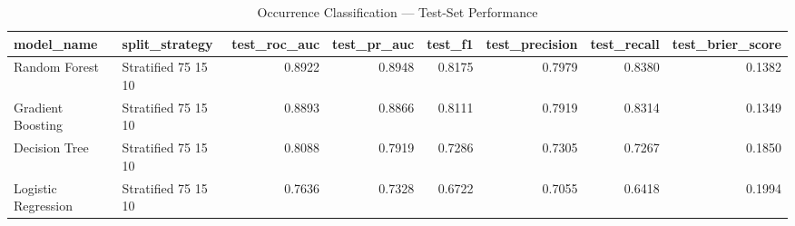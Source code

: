 \begin{table}
\caption{Occurrence Classification — Test-Set Performance}
\label{tab:occurrence_results}
\begin{tabular}{llrrrrrr}
\toprule
model_name & split_strategy & test_roc_auc & test_pr_auc & test_f1 & test_precision & test_recall & test_brier_score \\
\midrule
Random Forest & Stratified 75 15 10 & 0.8922 & 0.8948 & 0.8175 & 0.7979 & 0.8380 & 0.1382 \\
Gradient Boosting & Stratified 75 15 10 & 0.8893 & 0.8866 & 0.8111 & 0.7919 & 0.8314 & 0.1349 \\
Decision Tree & Stratified 75 15 10 & 0.8088 & 0.7919 & 0.7286 & 0.7305 & 0.7267 & 0.1850 \\
Logistic Regression & Stratified 75 15 10 & 0.7636 & 0.7328 & 0.6722 & 0.7055 & 0.6418 & 0.1994 \\
\bottomrule
\end{tabular}
\end{table}
